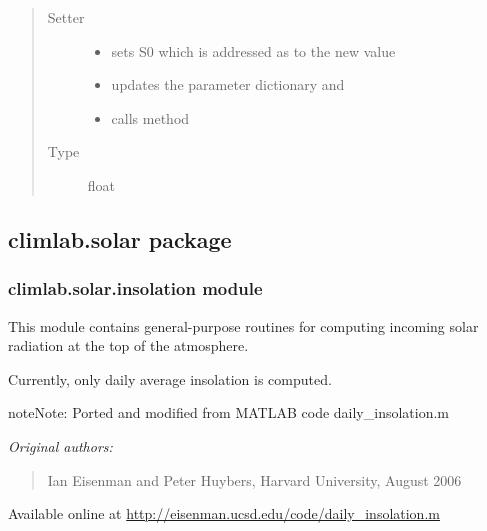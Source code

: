 \documentclass[a4paper,10pt,english]{sphinxmanual}
\begin{document}
\begin{fulllineitems}
\begin{fulllineitems}
\begin{quote}
\begin{description}
\item[{Setter}] \leavevmode\begin{itemize}
\item {} 
sets S0 which is addressed as  to the new value

\item {} 
updates the parameter dictionary  and

\item {} 
calls method 

\end{itemize}

\item[{Type}] \leavevmode
float

\end{description}\end{quote}

\end{fulllineitems}


\end{fulllineitems}



\subsection{climlab.solar package}
\label{api/climlab.solar::doc}\label{api/climlab.solar:climlab-solar-package}

\subsubsection{climlab.solar.insolation module}
\label{api/climlab.solar:module-climlab.solar.insolation}\label{api/climlab.solar:climlab-solar-insolation-module}
This module contains general-purpose routines for computing incoming
solar radiation at the top of the atmosphere.

Currently, only daily average insolation is computed.

\begin{notice}{note}{Note:}
Ported and modified from MATLAB code daily\_insolation.m

\emph{Original authors:}
\begin{quote}

Ian Eisenman and Peter Huybers, Harvard University, August 2006
\end{quote}

Available online at \href{http://eisenman.ucsd.edu/code/daily\_insolation.m}{http://eisenman.ucsd.edu/code/daily\_insolation.m}
\end{notice}
\end{document}
